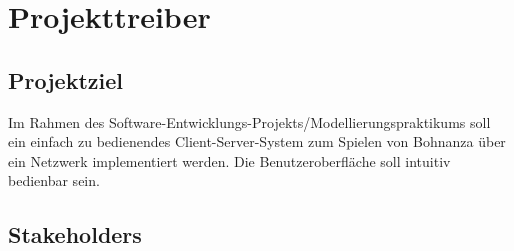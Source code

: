 \chapter{Projekttreiber}

\section{Projektziel}

Im Rahmen des Software-Entwicklungs-Projekts/Modellierungspraktikums {\the\year} soll ein einfach zu bedienendes Client-Server-System zum Spielen von Bohnanza über ein Netzwerk implementiert werden. Die Benutzeroberfläche soll intuitiv bedienbar sein.

\section{Stakeholders}

\setcounter{sh}{10}

